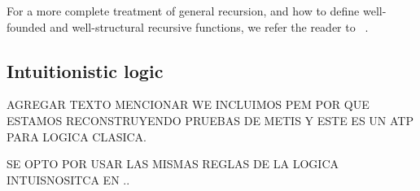 \documentclass[../main.tex]{subfiles}
\begin{document}
For a more complete treatment of general recursion, and how to
define well-founded and well-structural recursive functions, we refer
the reader to \citeauthor{Bove2005}~\cite{Bove2005}.

\subsection{Intuitionistic logic}
\label{ssec:intuitionistic-logic}

AGREGAR TEXTO
MENCIONAR WE INCLUIMOS PEM POR QUE ESTAMOS RECONSTRUYENDO PRUEBAS
DE METIS Y ESTE ES UN ATP PARA LOGICA CLASICA.

SE OPTO POR USAR LAS MISMAS REGLAS DE LA LOGICA INTUISNOSITCA
EN .\cite{Altenkirch2015}.
\end{document}
